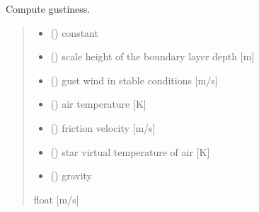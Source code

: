 \documentclass[letterpaper,10pt,english]{sphinxmanual}
\begin{document}
\begin{fulllineitems}
\label{\detokenize{users_guide:AirSeaFluxCode.flux_subs.get_gust}}
\pysigstartsignatures
{}
\pysigstopsignatures
\sphinxAtStartPar
Compute gustiness.
\begin{quote}\begin{description}
\begin{itemize}
\item {} 
\sphinxAtStartPar
{} () \textendash{} constant

\item {} 
\sphinxAtStartPar
{} () \textendash{} scale height of the boundary layer depth {[}m{]}

\item {} 
\sphinxAtStartPar
{} () \textendash{} gust wind in stable conditions   {[}m/s{]}

\item {} 
\sphinxAtStartPar
{} () \textendash{} air temperature   {[}K{]}

\item {} 
\sphinxAtStartPar
{} () \textendash{} friction velocity {[}m/s{]}

\item {} 
\sphinxAtStartPar
{} () \textendash{} star virtual temperature of air {[}K{]}

\item {} 
\sphinxAtStartPar
{} () \textendash{} gravity

\end{itemize}

\sphinxAtStartPar
{}

\sphinxAtStartPar
float        {[}m/s{]}

\end{description}\end{quote}

\end{fulllineitems}
\end{document}
